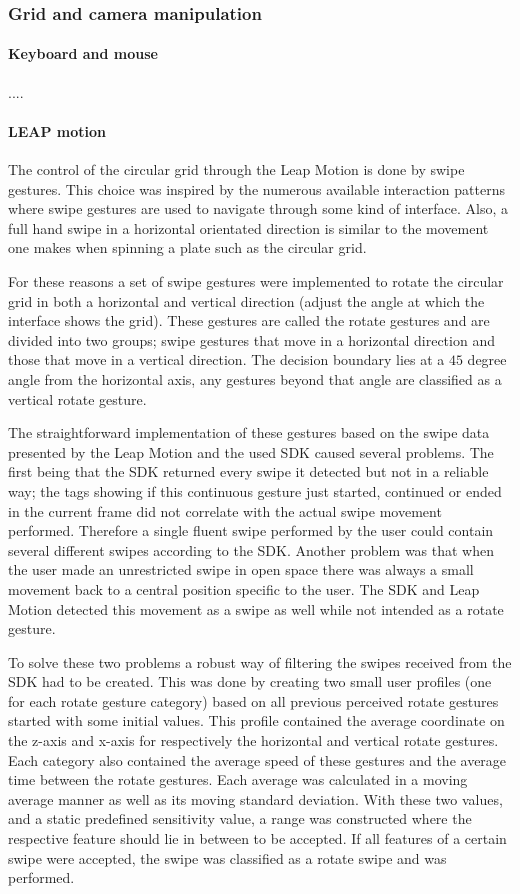 \subsubsection{Grid and camera manipulation}

\paragraph{Keyboard and mouse}
....

\paragraph{LEAP motion}
The control of the circular grid through the Leap Motion is done by
swipe gestures. This choice was inspired by the numerous available
interaction patterns where swipe gestures are used to navigate through
some kind of interface. Also, a full hand swipe in a horizontal orientated
direction is similar to the movement one makes when spinning a plate
such as the circular grid. 

For these reasons a set of swipe gestures were implemented to rotate
the circular grid in both a horizontal and vertical direction (adjust
the angle at which the interface shows the grid). These gestures are
called the rotate gestures and are divided into two groups; swipe
gestures that move in a horizontal direction and those that move in
a vertical direction. The decision boundary lies at a $45$ degree
angle from the horizontal axis, any gestures beyond that angle are
classified as a vertical rotate gesture.

The straightforward implementation of these gestures based on the
swipe data presented by the Leap Motion and the used SDK caused several
problems. The first being that the SDK returned every swipe it detected
but not in a reliable way; the tags showing if this continuous gesture
just started, continued or ended in the current frame did not correlate
with the actual swipe movement performed. Therefore a single fluent
swipe performed by the user could contain several different swipes
according to the SDK. Another problem was that when the user made
an unrestricted swipe in open space there was always a small movement
back to a central position specific to the user. The SDK and Leap
Motion detected this movement as a swipe as well while not intended
as a rotate gesture. 

To solve these two problems a robust way of filtering the swipes received
from the SDK had to be created. This was done by creating two small
user profiles (one for each rotate gesture category) based on all
previous perceived rotate gestures started with some initial values.
This profile contained the average coordinate on the z-axis and x-axis
for respectively the horizontal and vertical rotate gestures. Each
category also contained the average speed of these gestures and the
average time between the rotate gestures. Each average was calculated
in a moving average manner as well as its moving standard deviation.
With these two values, and a static predefined sensitivity value,
a range was constructed where the respective feature should lie in
between to be accepted. If all features of a certain swipe were accepted,
the swipe was classified as a rotate swipe and was performed. 

